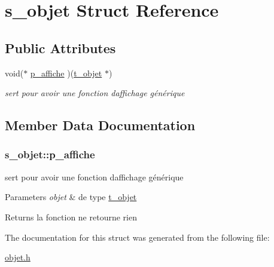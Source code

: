 \hypertarget{structs__objet}{}\section{s\+\_\+objet Struct Reference}
\label{structs__objet}
\subsection*{Public Attributes}
\begin{DoxyCompactItemize}
\item 
void($\ast$ \hyperlink{structs__objet_ac6619f11433c9e78ceabef66cbe69221}{p\+\_\+affiche} )(\hyperlink{structt__objet}{t\+\_\+objet} $\ast$)
\begin{DoxyCompactList}\small\item\em sert pour avoir une fonction d\textquotesingle{}affichage générique \end{DoxyCompactList}\end{DoxyCompactItemize}


\subsection{Member Data Documentation}
\subsubsection[{\texorpdfstring{p\+\_\+affiche}{p_affiche}}]{\setlength{\rightskip}{0pt plus 5cm}s\+\_\+objet\+::p\+\_\+affiche}\hypertarget{structs__objet_ac6619f11433c9e78ceabef66cbe69221}{}\label{structs__objet_ac6619f11433c9e78ceabef66cbe69221}


sert pour avoir une fonction d\textquotesingle{}affichage générique 


\begin{DoxyParams}{Parameters}
{\em objet} & de type \hyperlink{structt__objet}{t\+\_\+objet} \\
\hline
\end{DoxyParams}
\begin{DoxyReturn}{Returns}
la fonction ne retourne rien 
\end{DoxyReturn}


The documentation for this struct was generated from the following file\+:\begin{DoxyCompactItemize}
\item 
\hyperlink{objet_8h}{objet.\+h}\end{DoxyCompactItemize}
